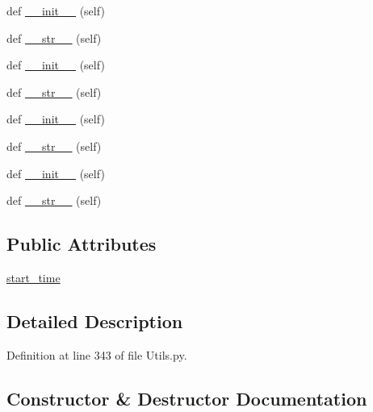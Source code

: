 \begin{DoxyCompactItemize}
def \hyperlink{classwaflib_1_1_utils_1_1_timer_acfedd95753b896b464edea4c4ad06fd2}{\+\_\+\+\_\+init\+\_\+\+\_\+} (self)
\item 
def \hyperlink{classwaflib_1_1_utils_1_1_timer_aae739d38ffcadf055382c419da8680d8}{\+\_\+\+\_\+str\+\_\+\+\_\+} (self)
\item 
def \hyperlink{classwaflib_1_1_utils_1_1_timer_acfedd95753b896b464edea4c4ad06fd2}{\+\_\+\+\_\+init\+\_\+\+\_\+} (self)
\item 
def \hyperlink{classwaflib_1_1_utils_1_1_timer_aae739d38ffcadf055382c419da8680d8}{\+\_\+\+\_\+str\+\_\+\+\_\+} (self)
\item 
def \hyperlink{classwaflib_1_1_utils_1_1_timer_acfedd95753b896b464edea4c4ad06fd2}{\+\_\+\+\_\+init\+\_\+\+\_\+} (self)
\item 
def \hyperlink{classwaflib_1_1_utils_1_1_timer_aae739d38ffcadf055382c419da8680d8}{\+\_\+\+\_\+str\+\_\+\+\_\+} (self)
\item 
def \hyperlink{classwaflib_1_1_utils_1_1_timer_acfedd95753b896b464edea4c4ad06fd2}{\+\_\+\+\_\+init\+\_\+\+\_\+} (self)
\item 
def \hyperlink{classwaflib_1_1_utils_1_1_timer_aae739d38ffcadf055382c419da8680d8}{\+\_\+\+\_\+str\+\_\+\+\_\+} (self)
\end{DoxyCompactItemize}
\subsection*{Public Attributes}
\begin{DoxyCompactItemize}
\item 
\hyperlink{classwaflib_1_1_utils_1_1_timer_a07b815d67d9c3abd6bfd8d7f149bae6e}{start\+\_\+time}
\end{DoxyCompactItemize}


\subsection{Detailed Description}


Definition at line 343 of file Utils.\+py.



\subsection{Constructor \& Destructor Documentation}
